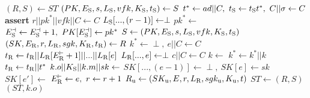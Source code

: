 \algrenewcommand\textproc{}
\algrenewcommand{}

\begin{minipage}{1.2\linewidth}
  {\fontsize{8}{10}\selectfont
    \begin{multicols}{2}
  \begin{algorithmic}[1]
    \State $(R,S) \gets ST$
    \State $(PK,E_\text{S},s,L_\text{S},vfk,K_\text{S},t_\text{S}) \gets S$
    \State $t^* \gets ad||C, \ t_\text{S} \gets t_\text{S} t^*, \ C || \sigma \gets C$
    \State \textbf{assert} 
    \State $r||pk^*||vfk||C \gets C$
    \State $L_\text{S}[...,(r-1)] \gets \perp$
    \State $pk^* \gets$ 
    \EndFor
    \State $E_\t{S}^\dashv \gets E_\t{S}^\dashv+1, \ PK[E_\t{S}^\dashv] \gets pk^*$
    \State $S \gets (PK,E_\text{S},s,L_\text{S},vfk,K_\text{S},t_\text{S})$
    \State $(SK,E_\text{R},r,L_\text{R},sgk,K_\text{R},t_\text{R}) \gets R$
    \State $k^* \gets \perp, \ e||C \gets C$
    \State $t_\text{R} \gets t_\text{R} || L_\text{R}[E_\text{R}^\vdash+1]||...||L_\text{R}[e]$
    \State $L_\text{R}[...,e] \gets \perp$
    \State $c||C \gets C$
    \State $k \gets$ 
    \State $k^* \gets k^* ||k$
    \EndFor
    \State $t_\text{R} \gets t_\text{R}||t^*$
    \State $k.o || K_\text{S} || k.m || sk \gets$ 
    \State $SK[...,(e -1)] \gets \perp, \ SK[e] \gets sk$
    \State $SK[e'] \gets$ 
    \EndFor
    \State $E_\text{R}^\vdash \gets e, \ r \gets r+1$
    \State $R_\text{u} \gets (SK_\text{u},E,r,L_\text{R},sgk_\text{u},K_\text{u},t)$
    \State $ST \gets (R,S)$
    \State \Return $(ST,k.o)$ 
    \EndProcedure
  \end{algorithmic}
  \end{multicols}
  }
\end{minipage}